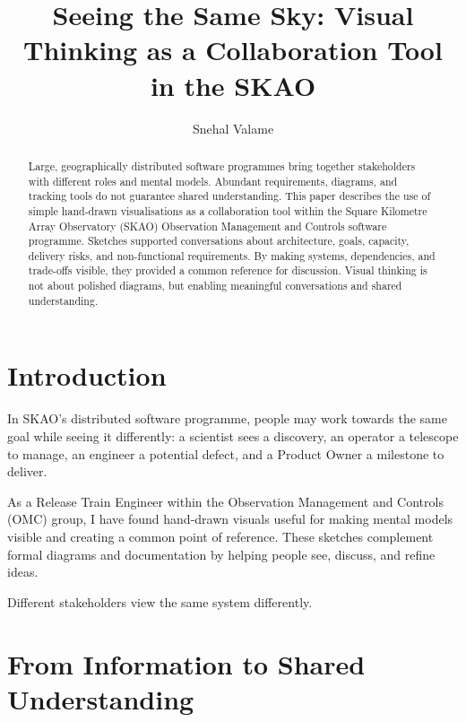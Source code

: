 \documentclass[11pt,twoside]{article}
\begin{document}
\title{Seeing the Same Sky: Visual Thinking as a Collaboration Tool in the SKAO}

\author{Snehal Valame}




\begin{abstract}
Large, geographically distributed software programmes bring together
stakeholders with different roles and mental models. Abundant
requirements, diagrams, and tracking tools do not guarantee shared
understanding. This paper describes the use of simple hand-drawn
visualisations as a collaboration tool within the Square Kilometre
Array Observatory (SKAO) Observation Management and Controls
software programme. Sketches supported conversations about
architecture, goals, capacity, delivery risks, and non-functional
requirements. By making systems, dependencies, and trade-offs
visible, they provided a common reference for discussion.
Visual thinking is not about polished diagrams, but enabling
meaningful conversations and shared understanding.
\end{abstract}


\section{Introduction}

In SKAO's distributed software programme, people may work
towards the same goal while seeing it differently: a scientist
sees a discovery, an operator a telescope to manage, an engineer
a potential defect, and a Product Owner a milestone to deliver.

As a Release Train Engineer within the Observation Management
and Controls (OMC) group, I have found hand-drawn visuals
useful for making mental models visible and creating a common
point of reference. These sketches complement formal diagrams
and documentation by helping people see, discuss, and refine ideas.

{Different stakeholders view the same system differently.}


\section{From Information to Shared Understanding}
\end{document}
